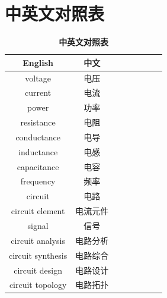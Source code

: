 \documentclass[UTF8]{report}
\theoremstyle{MyLineTheoremStyle} %
\theoremstyle{MyBlockTheoremStyle} %
\theoremstyle{MySubsubsectionStyle} %
\begin{document}
\section{中英文对照表}
\begin{multicols}{2}  

    \begin{table}[H]\centering
    \caption{\textbf{中英文对照表}}
    \begin{tabular}{cccccccc}\toprule
        English & 中文 \\
        \midrule
        voltage            & 电压 \\
        current            & 电流 \\
        power              & 功率 \\
        resistance         & 电阻 \\
        conductance        & 电导 \\
        inductance         & 电感 \\
        capacitance        & 电容 \\
        frequency          & 频率 \\
        circuit            & 电路 \\
        circuit element    & 电流元件 \\
        signal             & 信号 \\
        circuit analysis   & 电路分析 \\
        circuit synthesis  & 电路综合 \\
        circuit design     & 电路设计 \\
        circuit topology   & 电路拓扑 \\
        \bottomrule
    \end{tabular}
    \end{table}
    

\end{multicols}
\end{document}
